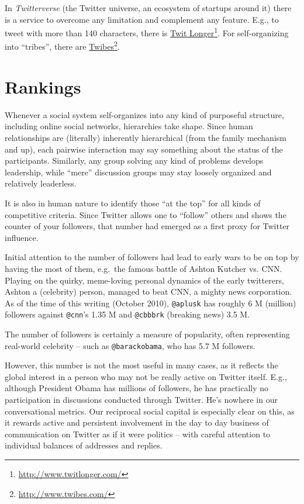 \documentclass[10pt,oneside]{memoir}
\begin{document}
In {\itshape Twitterverse} (the Twitter universe, an ecosystem of startups around it) there is a service to overcome any limitation and complement any feature.  E.g., to tweet with more than 140 characters, there is \href{http://www.twitlonger.com/}{Twit Longer}\footnote{\href{http://www.twitlonger.com/}{http://www.twitlonger.com/}}.  For self-organizing into ``tribes'', there are \href{http://www.twibes.com/}{Twibes}\footnote{\href{http://www.twibes.com/}{http://www.twibes.com/}}.


\pagebreak \section{Rankings}
\label{rankings}

Whenever a social system self-organizes into any kind of purposeful structure, including online social networks, hierarchies take shape.  Since human relationships are (literally) inherently hierarchical (from the family mechanism and up), each pairwise interaction may say something about the status of the participants.  Similarly, any group solving any kind of problems develops leadership, while ``mere'' discussion groups may stay loosely organized and relatively leaderless.


It is also in human nature to identify those ``at the top'' for all kinds of competitive criteria.  Since Twitter allows one to ``follow'' others and shows the counter of your followers, that number had emerged as a first proxy for Twitter influence.  


Initial attention to the number of followers had lead to early wars to be on top by having the most of them, e.g.\ the famous battle of Ashton Kutcher vs. CNN.  Playing on the quirky, meme-loving personal dynamics of the early twitterers, Ashton a (celebrity) person, managed to beat CNN, a mighty news corporation.  As of the time of this writing (October 2010), \texttt{@aplusk} has roughly 6 M (million) followers against \texttt{@cnn}'s 1.35 M and \texttt{@cbbbrk} (breaking news) 3.5 M.


The number of followers is certainly a measure of popularity, often representing real-world celebrity -- such as \texttt{@barackobama}, who has 5.7 M followers. 


However, this number is not the most useful in many cases, as it reflects the global interest in a person who may not be really active on Twitter itself.  E.g., although President Obama has millions of followers,  he has practically no participation in discussions conducted through Twitter.  He's nowhere in our conversational metrics.  Our reciprocal social capital is especially clear on this, as it rewards active and persistent involvement in the day to day business of communication on Twitter as if it were politics -- with careful attention to individual balances of addresses and replies.
\end{document}
